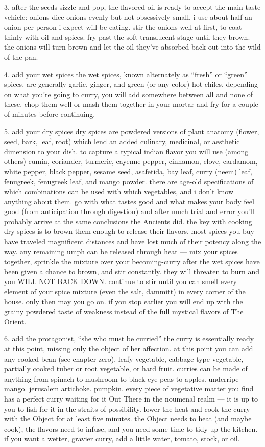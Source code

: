 3. after the seeds sizzle and pop, the flavored oil is ready to accept the main taste vehicle: onions
	dice onions evenly but not obsessively small. i use about half an onion per person i expect will be eating.
	stir the onions well at first, to coat thinly with oil and spices. fry past the soft translucent stage until they brown.
	the onions will turn brown and let the oil they've absorbed back out into the wild of the pan.

4. add your wet spices 
	the wet spices, known alternately as ``fresh'' or ``green'' spices, are generally garlic, ginger, and green (or any color) hot chiles. depending on what you're going to curry, you will add somewhere between all and none of these. chop them well or mash them together in your mortar and fry for a couple of minutes before continuing.

5. add your dry spices
	dry spices are powdered versions of plant anatomy (flower, seed, bark, leaf, root) which lend an added culinary, medicinal, or aesthetic dimension to your dish. to capture a typical indian flavor you will use (among others) cumin, coriander, turmeric, cayenne pepper, cinnamon, clove, cardamom, white pepper, black pepper, sesame seed, asafetida, bay leaf, curry (neem) leaf, fenugreek, fenugreek leaf, and mango powder. there are age-old specifications of which combinations can be used with which vegetables, and i don't know anything about them. go with what tastes good and what makes your body feel good (from anticipation through digestion) and after much trial and error you'll probably arrive at the same conclusions the Ancients did.
	the key with cooking dry spices is to brown them enough to release their flavors. most spices you buy have traveled magnificent distances and have lost much of their potency along the way. any remaining umph can be released through heat --- mix your spices together, sprinkle the mixture over your becoming-curry after the wet spices have been given a chance to brown, and stir constantly. they will threaten to burn and you WILL NOT BACK DOWN. continue to stir until you can smell every element of your spice mixture (even the salt, dammitt) in every corner of the house. only then may you go on. if you stop earlier you will end up with the grainy powdered taste of weakness instead of the full mystical flavors of The Orient.

6. add the protagonist, ``she who must be curried''
	the curry is essentially ready at this point, missing only the object of her affection. at this point you can add any cooked bean (see chapter zero), leafy vegetable, cabbage-type vegetable, partially cooked tuber or root vegetable, or hard fruit. curries can be made of anything from spinach to mushroom to black-eye peas to apples. underripe mango. jerusalem artichoke. pumpkin. every piece of vegetative matter you find has a perfect curry waiting for it Out There in the noumenal realm --- it is up to you to fish for it in the straits of possibility.
	lower the heat and cook the curry with the Object for at least five minutes. the Object needs to heat (and maybe cook), the flavors need to infuse, and you need some time to tidy up the kitchen. if you want a wetter, gravier curry, add a little water, tomato, stock, or oil.

